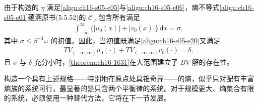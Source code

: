 \documentclass[../../main.tex]{subfiles}
\begin{document}
由于构造的 $\eta$ 满足\eqref{align:ch16-s05-e05}与\eqref{align:ch16-s05-e06}，熵不等式\eqref{align:ch16-s05-e01}蕴涵原书(5.5.52)的 $\mathscr{C}_\omega$ 包含所有满足
\begin{align}
\int_{-\infty}^{\infty}\{|u_0(x)|+|v_0(x)|\}\,\mathrm{d}x=\sigma,
\label{align:ch16-s05-e20}
\end{align}
其中 $\sigma\leqslant\beta^{-1}\omega$ 的初值。因此，当初值既满足\eqref{align:ch16-s05-e20}又满足
\begin{align}
TV_{(-\infty,\infty)}u_0(\cdot)+TV_{(-\infty,\infty)}v_0(\cdot)=\delta,
\label{align:ch16-s05-e21}
\end{align}
且 $\sigma$ 与 $\delta$ 充分小时，\cref{theorem:ch16-1631}在大范围建立了 $BV$ 解的存在性。

构造一个具有上述规格——特别地在原点处具锥奇异——的熵，似乎只对配有丰富熵族的系统可行，最显著的是只含两个平衡律的系统。对于规模更大、熵集合有限的系统，必须使用一种替代方法，它将在下一节发展。
\end{document}
